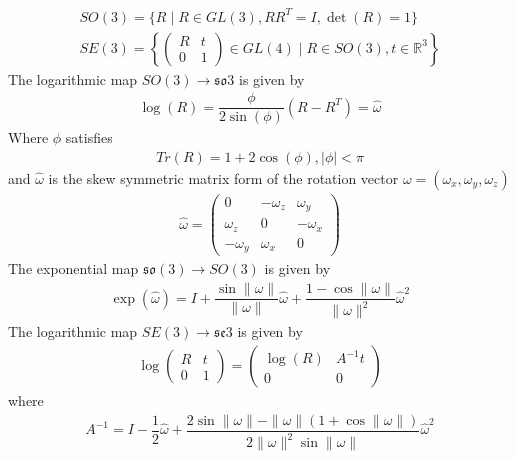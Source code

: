 \begin{align}
  SO(3) = \{ R \mid R \in GL(3), RR^T = I, \det(R) = 1 \} \\
  SE(3) =  \left\{ \left( 
             \begin{array}{cc}
             R & t \\
             0 & 1 \end{array} \right) 
  \in GL(4) \mid R\in SO(3), t \in \mathbb R^3
\right\}
\end{align}
The logarithmic map $SO(3) \to \mathfrak{so}{3}$ is given by
\begin{align}
 \log(R) = \dfrac{\phi}{2\sin(\phi)}(R-R^T) = \hat\omega
\end{align}
Where $\phi$ satisfies
\begin{align}
 Tr(R) = 1 + 2\cos(\phi), |\phi| < \pi
\end{align}
and $\hat\omega$ is the skew symmetric matrix form of the rotation vector $\omega = (\omega_x, \omega_y, \omega_z)$
\begin{align}
 \hat\omega = \left( \begin{array}{ccc}
                      0         & -\omega_z &  \omega_y \\
                      \omega_z  & 0         & -\omega_x \\
                      -\omega_y & \omega_x  & 0
                     \end{array} \right)
\end{align}
The exponential map $\mathfrak{so}(3) \to SO(3)$ is given by
\begin{align}
 \exp(\hat\omega) = I + \dfrac{\sin\|\omega\|}{\|\omega\|}\hat\omega + 
                  \dfrac{1 - \cos\|\omega\|}{\|\omega\|^2}\hat\omega^2
\end{align}
The logarithmic map $SE(3) \to \mathfrak{se}{3}$ is given by
\begin{align}
  \log\left( \begin{array}{cc}
              R & t \\
              0 & 1 
             \end{array} \right)
 =
 \left( \begin{array}{cc}
         \log(R) & A^{-1}t \\
         0 & 0  
        \end{array} \right)
\end{align}
where
\begin{align}
 A^{-1} = I - \dfrac{1}{2}\hat\omega 
          + \dfrac{2\sin\|\omega\| - \|\omega\|(1+\cos\|\omega\|)}
                  {2\|\omega\|^2\sin\|\omega\|}\hat\omega^2
\end{align}
